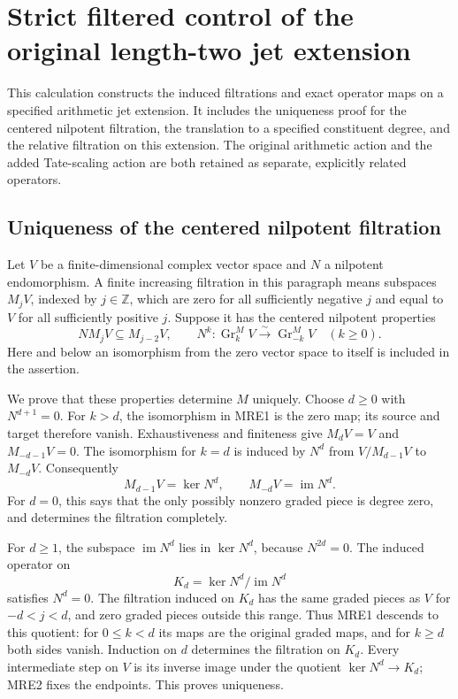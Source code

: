 \section{Strict filtered control of the original length-two jet extension}
\label{CFStage:sec:tau-mixed-relative-extension-control}

This calculation constructs the induced filtrations and exact operator maps
on a specified arithmetic jet extension. It includes the uniqueness proof
for the centered nilpotent filtration, the translation to a specified
constituent degree, and the relative filtration on this extension.
The original arithmetic action and the added Tate-scaling action are both
retained as separate, explicitly related operators.

\subsection{Uniqueness of the centered nilpotent filtration}

Let \(V\) be a finite-dimensional complex vector space and \(N\) a nilpotent
endomorphism. A finite increasing filtration in this paragraph means
subspaces \(M_jV\), indexed by \(j\in\mathbb Z\), which are zero for all
sufficiently negative \(j\) and equal to \(V\) for all sufficiently positive
\(j\). Suppose it has the centered nilpotent properties
\[
 NM_jV\subseteq M_{j-2}V,\qquad
 N^k:\operatorname{Gr}_k^M V\xrightarrow{\sim}
                    \operatorname{Gr}_{-k}^M V\quad(k\geq0).
 \tag{MRE1}
\]
Here and below an isomorphism from the zero vector space to itself is
included in the assertion.

We prove that these properties determine \(M\) uniquely. Choose \(d\geq0\)
with \(N^{d+1}=0\). For \(k>d\), the isomorphism in MRE1 is the zero map;
its source and target therefore vanish. Exhaustiveness and finiteness give
\(M_dV=V\) and \(M_{-d-1}V=0\). The isomorphism for \(k=d\) is induced by
\(N^d\) from \(V/M_{d-1}V\) to \(M_{-d}V\). Consequently
\[
 M_{d-1}V=\ker N^d,\qquad M_{-d}V=\operatorname{im}N^d.
 \tag{MRE2}
\]
For \(d=0\), this says that the only possibly nonzero graded piece is
degree zero, and determines the filtration completely.

For \(d\geq1\), the subspace \(\operatorname{im}N^d\) lies in
\(\ker N^d\), because \(N^{2d}=0\). The induced operator on
\[
 K_d=\ker N^d/\operatorname{im}N^d
 \tag{MRE3}
\]
satisfies \(N^d=0\). The filtration induced on \(K_d\) has the same graded
pieces as \(V\) for \(-d<j<d\), and zero graded pieces outside this range.
Thus MRE1 descends to this quotient: for \(0\leq k<d\) its maps are the
original graded maps, and for \(k\geq d\) both sides vanish. Induction on
\(d\) determines the filtration on \(K_d\). Every intermediate step on
\(V\) is its inverse image under the quotient
\(\ker N^d\longrightarrow K_d\); MRE2 fixes the endpoints. This proves
uniqueness.


